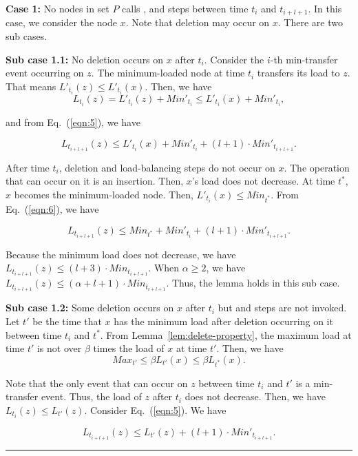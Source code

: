\documentclass[a4paper]{article}
\newenvironment{proof}{{\bf Proof:}}{\hfill\rule{1.5mm}{3mm}\vspace{0.1in}}
\begin{document}
\begin{proof}
  \textbf{Case 1:} No nodes in set $P$ calls {\minbalance},
  {\splitmax} and {\splitnbr} steps between time $t_i$ and
  $t_{i+l+1}$. In this case, we consider the node $x$. Note that deletion may occur on $x$.  
  There are two sub cases.

  \textbf{Sub case 1.1:} No deletion occurs on $x$ after $t_i$.
  Consider the $i$-th min-transfer event occurring on $z$. The minimum-loaded
  node at time $t_i$ transfers its load to $z$. That means
  $L'_{t_i}(z)\leq L'_{t_i}(x)$. Then, we have
\[
L_{t_i}(z)=L'_{t_i}(z)+Min'_{t_i}\leq L'_{t_i}(x)+Min'_{t_i},
\]

and from Eq.~(\ref{eqn:5}), we have

\begin{equation}\label{eqn:6}
  L_{t_{i+l+1}}(z) \leq L'_{t_i}(x)+Min'_{t_i} + (l+1)\cdot
  Min'_{t_{i+l+1}}.
\end{equation}

After time $t_i$, deletion and load-balancing steps do not occur on
$x$.  The operation that can occur on it is an insertion. Then, $x$'s
load does not decrease.  At time $t^*$, $x$ becomes the minimum-loaded
node. Then, $L'_{t_i}(x)\leq Min_{t^*}$.  From Eq.~(\ref{eqn:6}), we
have

\[L_{t_{i+l+1}}(z) \leq Min_{t^*}+Min'_{t_i} + (l+1)\cdot
Min'_{t_{i+l+1}}.\]

Because the minimum load does not decrease, we have $ L_{t_{i+l+1}}(z)
\leq (l+3)\cdot Min_{t_{i+l+1}}$. When $\alpha\geq 2$, we have
$L_{t_{i+l+1}}(z)\leq (\alpha+l+1)\cdot Min_{t_{i+l+1}}$. Thus, the
lemma holds in this sub case.

\textbf{Sub case 1.2:} Some deletion occurs on $x$ after $t_i$ but
{\splitmax} and {\splitnbr} steps are not invoked. Let $t'$ be the
time that $x$ has the minimum load after deletion occurring on it
between time $t_i$ and $t^*$. From Lemma~\ref{lem:delete-property},
the maximum load at time $t'$ is not over $\beta$ times  the load of
$x$ at time $t'$.  Then, we have
\begin{equation}\label{eqn:max_time_t}
 Max_{t'}\leq\beta L_{t'}(x)\leq\beta L_{t^*}(x). 
 \end{equation}

 Note that the only event that can occur on $z$ between time $t_i$
 and $t'$ is a min-transfer event. Thus, the load of $z$ after $t_i$
 does not decrease. Then, we have $L_{t_i}(z)\leq L_{t'}(z)$. Consider
 Eq.~(\ref{eqn:5}). We have

 \[L_{t_{i+l+1}}(z)\leq L_{t'}(z) + (l+1)\cdot Min'_{t_{i+l+1}}.\]


\end{proof}
\end{document}
